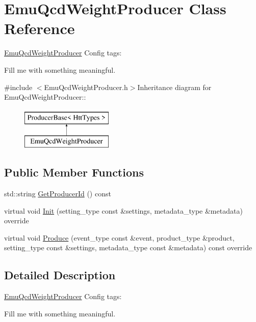 \hypertarget{classEmuQcdWeightProducer}{
\section{EmuQcdWeightProducer Class Reference}
\label{classEmuQcdWeightProducer}
}


\hyperlink{classEmuQcdWeightProducer}{EmuQcdWeightProducer} Config tags:
\begin{DoxyItemize}
\item Fill me with something meaningful. 
\end{DoxyItemize} 


{\ttfamily \#include $<$EmuQcdWeightProducer.h$>$}Inheritance diagram for EmuQcdWeightProducer::\begin{figure}[H]
\begin{center}
\leavevmode
\includegraphics[height=2cm]{classEmuQcdWeightProducer}
\end{center}
\end{figure}
\subsection*{Public Member Functions}
\begin{DoxyCompactItemize}
\item 
std::string \hyperlink{classEmuQcdWeightProducer_af4587e953e530e649d0483531b3be3fe}{GetProducerId} () const 
\item 
virtual void \hyperlink{classEmuQcdWeightProducer_a60ca41c6c92ef55ba1b57ae71663bac6}{Init} (setting\_\-type const \&settings, metadata\_\-type \&metadata) override
\item 
virtual void \hyperlink{classEmuQcdWeightProducer_adb42a9ee5c3812e3b0e32632d8f244ef}{Produce} (event\_\-type const \&event, product\_\-type \&product, setting\_\-type const \&settings, metadata\_\-type const \&metadata) const override
\end{DoxyCompactItemize}


\subsection{Detailed Description}
\hyperlink{classEmuQcdWeightProducer}{EmuQcdWeightProducer} Config tags:
\begin{DoxyItemize}
\item Fill me with something meaningful. 
\end{DoxyItemize}

